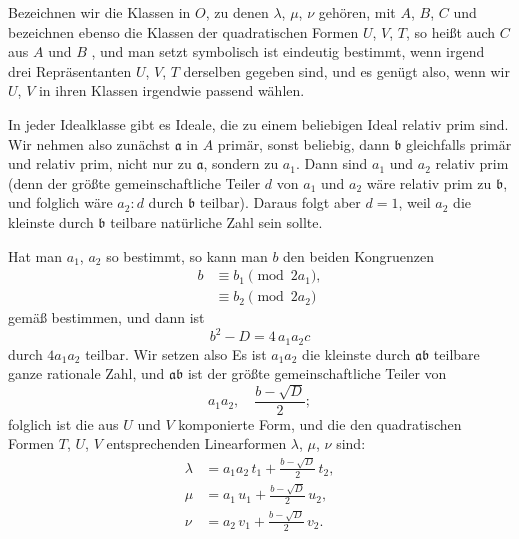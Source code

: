 Bezeichnen wir die Klassen in $O$, zu denen $\lambda$, $\mu$, $\nu$ gehören, mit $A$, $B$, $C$ und bezeichnen ebenso die Klassen der quadratischen Formen $U$, $V$, $T$, so heißt auch $C$ aus $A$ und $B$ , und man setzt symbolisch
 ist eindeutig bestimmt, wenn irgend drei Repräsentanten $U$, $V$, $T$ derselben gegeben sind, und es genügt also, wenn wir $U$, $V$ in ihren Klassen irgendwie passend wählen.

In jeder Idealklasse gibt es Ideale, die zu einem beliebigen Ideal relativ prim sind. Wir nehmen also zunächst $\mathfrak{a}$ in $A$ primär, sonst beliebig, dann $\mathfrak{b}$ gleichfalls primär und relativ prim, nicht nur zu $\mathfrak{a}$, sondern zu $a_1$. Dann sind $a_1$ und $a_2$ relativ prim (denn der größte gemeinschaftliche Teiler $d$ von $a_1$ und $a_2$ wäre relativ prim zu $\mathfrak{b}$, und folglich wäre $a_2 : d$ durch $\mathfrak{b}$ teilbar). Daraus folgt aber $d=1$, weil $a_2$ die kleinste durch $\mathfrak{b}$ teilbare natürliche Zahl sein sollte.

Hat man $a_1$, $a_2$ so bestimmt, so kann man $b$ den beiden Kongruenzen
\[
\begin{aligned}
b &\equiv b_1 \pmod{2 a_1}, \\
&\equiv b_2 \pmod{2 a_2}
\end{aligned}
\]
gemäß bestimmen, und dann ist
\[
b^2 - D = 4\,a_1 a_2 c
\]
durch $4 a_1 a_2$ teilbar. Wir setzen also
Es ist $a_1 a_2$ die kleinste durch $\mathfrak{a}\mathfrak{b}$ teilbare ganze rationale Zahl, und $\mathfrak{a}\mathfrak{b}$ ist der größte gemeinschaftliche Teiler von
\[
a_1 a_2, \quad \frac{b-\sqrt D}{2};
\]
folglich ist
die aus $U$ und $V$ komponierte Form, und die den quadratischen Formen $T$, $U$, $V$ entsprechenden Linearformen $\lambda$, $\mu$, $\nu$ sind:
\[
\begin{aligned}
\lambda &= a_1 a_2\,t_1 + \frac{b-\sqrt D}{2}\,t_2, \\
\mu &= a_1\,u_1 + \frac{b-\sqrt D}{2}\,u_2, \\
\nu &= a_2\,v_1 + \frac{b-\sqrt D}{2}\,v_2.
\end{aligned}
\]
